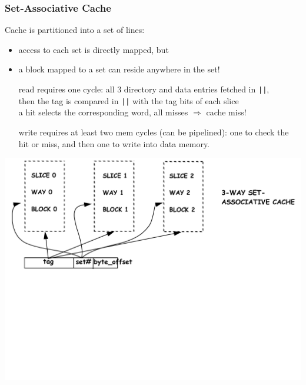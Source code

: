 \documentclass{beamer}
\renewcommand{\emph}[1]{\textcolor{structure}{#1}}
\newcommand{\emp}[1]{\textcolor{DikuRed}{ #1}}
\begin{document}
\begin{frame}[fragile,t]
\frametitle{Set-Associative Cache}
 
Cache is partitioned into a set of lines:
\begin{itemize}
    \item \emp{access to each set is directly mapped}, but
    \item \emph{a block mapped to a set can reside anywhere in the set}!
\end  {itemize} 

\begin{itemize}
    \item[read] requires one cycle: all 3 directory and data entries fetched in {\tt ||},\\
                then the tag is compared in {\tt ||} with the tag bits of each slice\\
                a hit selects the corresponding word, all misses $\Rightarrow$ cache miss! 
    \item[write] requires at least two mem cycles (can be pipelined): one to check the hit or miss, 
                and then one to write into data memory. 
                 
\end  {itemize}


\includegraphics[width=55ex]{FigsMemH/SetAssoc}

\end{frame}
\end{document}

